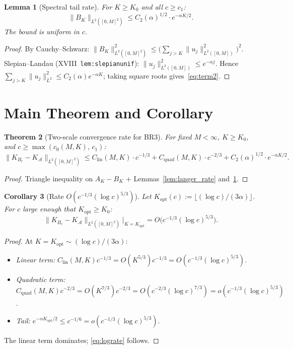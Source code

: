 \documentclass[12pt,a4paper]{amsart}
\newtheorem{theorem}{Theorem}[section]
\newtheorem{lemma}[theorem]{Lemma}
\newtheorem{corollary}[theorem]{Corollary}
\theoremstyle{definition}
\newcommand{\cA}{\mathcal{A}}
\newcommand{\cK}{K_{B_c}}
\newcommand{\cKA}{K_{\cA}}
\newcommand{\normh}[2]{\|#1\|_{#2}}
\newcommand{\Clin}{C_{\mathrm{lin}}(M,K)}
\newcommand{\Cquad}{C_{\mathrm{quad}}(M,K)}
\newcommand{\Ctwo}{C_2(\alpha)}
\newcommand{\Kopt}{K_{\mathrm{opt}}}
\newcommand{\AK}{A_K}
\newcommand{\BK}{B_K}
\begin{document}
\begin{lemma}[Spectral tail rate]
\label{lem:tail_rate}
For $K \geq K_0$ and all $c \geq c_1$:
\begin{equation}\label{eq:term2}
  \normh{\BK}{L^2([0,M]^2)}
  \leq \Ctwo^{1/2}\cdot e^{-\alpha K/2}.
\end{equation}
The bound is uniform in $c$.
\end{lemma}

\begin{proof}
By Cauchy--Schwarz:
$\normh{\BK}{L^2([0,M]^2)}^2
\leq\bigl(\sum_{j>K}\normh{u_j}{L^2([0,M])}^2\bigr)^2$.
Slepian--Landau (XVIII~\texttt{lem:slepianunif}):
$\normh{u_j}{L^2([0,M])}^2 \leq e^{-\alpha j}$.
Hence $\sum_{j>K}\normh{u_j}{L^2}^2 \leq \Ctwo e^{-\alpha K}$;
taking square roots gives~\eqref{eq:term2}.
\end{proof}

\section{Main Theorem and Corollary}
\label{sec:main}

\begin{theorem}[Two-scale convergence rate for BR3]
\label{thm:twoscale}
For fixed $M < \infty$, $K \geq K_0$, and
$c \geq \max(c_0(M,K),\,c_1)$:
\begin{equation}\label{eq:twoscale}
  \normh{\cK - \cKA}{L^2([0,M]^2)}
  \leq
  \Clin\cdot c^{-1/3}
  + \Cquad\cdot c^{-2/3}
  + \Ctwo^{1/2}\cdot e^{-\alpha K/2}.
\end{equation}
\end{theorem}

\begin{proof}
Triangle inequality on $\AK - \BK$ + Lemmas~\ref{lem:langer_rate}
and~\ref{lem:tail_rate}.
\end{proof}

\begin{corollary}[Rate $O(c^{-1/3}(\log c)^{5/3})$]
\label{cor:lograte}
Let $\Kopt(c) := \lfloor(\log c)/(3\alpha)\rfloor$.
For $c$ large enough that $\Kopt\geq K_0$:
\begin{equation}\label{eq:lograte}
  \normh{\cK - \cKA}{L^2([0,M]^2)}\Big|_{K=\Kopt}
  = O\bigl(c^{-1/3}(\log c)^{5/3}\bigr).
\end{equation}
\end{corollary}

\begin{proof}
At $K = \Kopt \sim (\log c)/(3\alpha)$:
\begin{itemize}[nosep]
  \item \emph{Linear term:}
    $\Clin c^{-1/3} = O(K^{5/3})c^{-1/3} = O(c^{-1/3}(\log c)^{5/3})$.
  \item \emph{Quadratic term:}
    $\Cquad c^{-2/3} = O(K^{7/3})c^{-2/3}
    = O(c^{-2/3}(\log c)^{7/3}) = o(c^{-1/3}(\log c)^{5/3})$.
  \item \emph{Tail:}
    $e^{-\alpha\Kopt/2} \leq c^{-1/6} = o(c^{-1/3}(\log c)^{5/3})$.
\end{itemize}
The linear term dominates; \eqref{eq:lograte} follows.
\end{proof}
\end{document}
